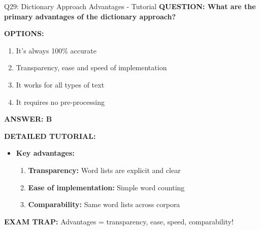 \documentclass[8pt]{beamer}
\begin{document}
	\begin{frame}{Q29: Dictionary Approach Advantages - Tutorial}
		\fontsize{6.5}{7.5}\selectfont
		\textbf{QUESTION: What are the primary advantages of the dictionary approach?}
		
		\vspace{0.1cm}
		\textbf{OPTIONS:}
		\begin{enumerate}
			\item It's always 100\% accurate
			\item Transparency, ease and speed of implementation
			\item It works for all types of text
			\item It requires no pre-processing
		\end{enumerate}
		
		\vspace{0.1cm}
		\textcolor{myblue}{\textbf{ANSWER: B}}
		
		\vspace{0.1cm}
		\textbf{DETAILED TUTORIAL:}
		\begin{itemize}
			\item \textbf{Key advantages:}
			\begin{enumerate}
				\item \textbf{Transparency:} Word lists are explicit and clear
				\item \textbf{Ease of implementation:} Simple word counting
				\item \textbf{Comparability:} Same word lists across corpora
			\end{enumerate}
		\end{itemize}
		
		\textcolor{myred}{\textbf{EXAM TRAP:}} Advantages = \textcolor{myblue}{transparency, ease, speed, comparability}!
	\end{frame}
	
\end{document}
